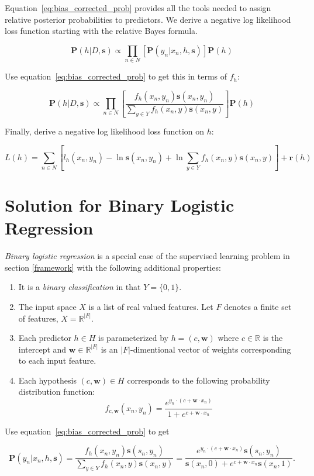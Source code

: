 \documentclass[twoside]{article}
\begin{document}
Equation~\eqref{eq:bias_corrected_prob} provides all the tools needed to assign relative posterior probabilities to predictors. We derive a negative log likelihood loss function starting with the relative Bayes formula.

\[\mathbf{P}(h|D,\mathbf{s})\propto\prod_{n \in N} \left[\mathbf{P}(y_n|x_n,h,\mathbf{s})\right]\mathbf{P}(h)\]

Use equation~\eqref{eq:bias_corrected_prob} to get this in terms of \(f_h\):

\[\mathbf{P}(h|D,\mathbf{s})\propto\prod_{n \in N} \left[\frac{f_h(x_n,y_n)\mathbf{s}(x_n,y_n)}{\sum_{y \in Y}f_h(x_n,y)\mathbf{s}(x_n,y)}\right]\mathbf{P}(h)\]

Finally, derive a negative log likelihood loss function on \(h\):

\[L(h)= \sum_{n \in N} \left[l_h(x_n,y_n)-\ln\mathbf{s}(x_n,y_n)+\ln\sum_{y \in Y}f_h(x_n,y)\mathbf{s}(x_n,y) \right] +\mathbf{r}(h)\]

\section{Solution for Binary Logistic Regression}
\label{section:logistic}

\textit{Binary logistic regression} is a special case of the supervised learning problem in section \ref{framework} with the following additional properties:

\begin{enumerate}
	\item It is a \textit{binary classification} in that \(Y = \{0, 1\}\).
	\item The input space \(X\) is a list of real valued features. Let \(F\) denotes a finite set of features, \(X = \mathbb{R} ^{|F|}\).
	\item Each predictor \(h \in H\) is parameterized by \(h = (c, \mathbf{w})\) where \(c \in \mathbb{R}\) is the intercept and \(\mathbf{w} \in \mathbb{R}^{|F|}\) is an \(|F|\)-dimentional vector of weights corresponding to each input feature.
          \item Each hypothesis \((c, \mathbf{w}) \in H\) corresponds to the following probability distribution function:
          \[f_{c,\mathbf{w}}(x_n, y_n)=\frac{e^{y_n \cdot (c+\mathbf{w} \cdot x_n)}}{1+e^{c+\mathbf{w} \cdot x_n}}\]
\end{enumerate}

Use equation~\eqref{eq:bias_corrected_prob} to get

\[\mathbf{P}(y_n|x_n,h,\mathbf{s})=\frac{f_h(x_n,y_n)\mathbf{s}(s_n,y_n)}{\sum_{y \in Y}f_h(x_n,y)\mathbf{s}(x_n,y)}=\frac{e^{y_n \cdot (c+\mathbf{w} \cdot x_n)}\mathbf{s}(s_n,y_n)}{\mathbf{s}(x_n,0)+e^{c+\mathbf{w} \cdot x_n}\mathbf{s}(x_n,1)}.\]
\end{document}
